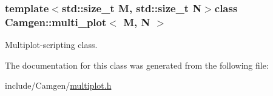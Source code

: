 \subsubsection*{template$<$std\-::size\-\_\-t M, std\-::size\-\_\-t N$>$class Camgen\-::multi\-\_\-plot$<$ M, N $>$}

Multiplot-\/scripting class. 

The documentation for this class was generated from the following file\-:\begin{DoxyCompactItemize}
\item 
include/\-Camgen/\hyperlink{a00677}{multiplot.\-h}\end{DoxyCompactItemize}
